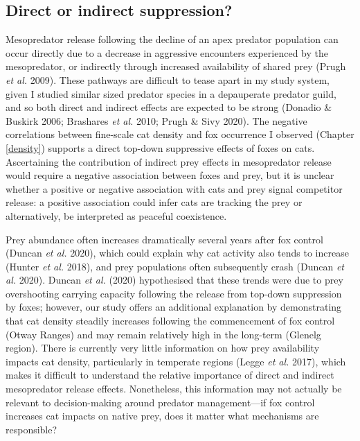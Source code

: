 \documentclass[11pt,a4paper,titlepage,twoside,openright]{style/unimelbthesis}
\begin{document}
\begin{mainmatter}
\hypertarget{direct-or-indirect-suppression}{%
\section{Direct or indirect suppression?}\label{direct-or-indirect-suppression}}

Mesopredator release following the decline of an apex predator population can occur directly due to a decrease in aggressive encounters experienced by the mesopredator, or indirectly through increased availability of shared prey (Prugh \emph{et al.} 2009). These pathways are difficult to tease apart in my study system, given I studied similar sized predator species in a depauperate predator guild, and so both direct and indirect effects are expected to be strong (Donadio \& Buskirk 2006; Brashares \emph{et al.} 2010; Prugh \& Sivy 2020). The negative correlations between fine-scale cat density and fox occurrence I observed (Chapter \ref{density}) supports a direct top-down suppressive effects of foxes on cats. Ascertaining the contribution of indirect prey effects in mesopredator release would require a negative association between foxes and prey, but it is unclear whether a positive or negative association with cats and prey signal competitor release: a positive association could infer cats are tracking the prey or alternatively, be interpreted as peaceful coexistence.

Prey abundance often increases dramatically several years after fox control (Duncan \emph{et al.} 2020), which could explain why cat activity also tends to increase (Hunter \emph{et al.} 2018), and prey populations often subsequently crash (Duncan \emph{et al.} 2020). Duncan \emph{et al.} (2020) hypothesised that these trends were due to prey overshooting carrying capacity following the release from top-down suppression by foxes; however, our study offers an additional explanation by demonstrating that cat density steadily increases following the commencement of fox control (Otway Ranges) and may remain relatively high in the long-term (Glenelg region). There is currently very little information on how prey availability impacts cat density, particularly in temperate regions (Legge \emph{et al.} 2017), which makes it difficult to understand the relative importance of direct and indirect mesopredator release effects. Nonetheless, this information may not actually be relevant to decision-making around predator management---if fox control increases cat impacts on native prey, does it matter what mechanisms are responsible?


\end{mainmatter}
\end{document}
